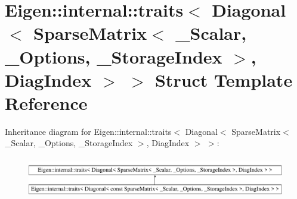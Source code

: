 \hypertarget{struct_eigen_1_1internal_1_1traits_3_01_diagonal_3_01_sparse_matrix_3_01___scalar_00_01___option6bd26e34064fdba33a44f3bb621d4cca}{}\section{Eigen\+::internal\+::traits$<$ Diagonal$<$ Sparse\+Matrix$<$ \+\_\+\+Scalar, \+\_\+\+Options, \+\_\+\+Storage\+Index $>$, Diag\+Index $>$ $>$ Struct Template Reference}
\label{struct_eigen_1_1internal_1_1traits_3_01_diagonal_3_01_sparse_matrix_3_01___scalar_00_01___option6bd26e34064fdba33a44f3bb621d4cca}
Inheritance diagram for Eigen\+::internal\+::traits$<$ Diagonal$<$ Sparse\+Matrix$<$ \+\_\+\+Scalar, \+\_\+\+Options, \+\_\+\+Storage\+Index $>$, Diag\+Index $>$ $>$\+:\begin{figure}[H]
\begin{center}
\leavevmode
\includegraphics[height=1.797753cm]{struct_eigen_1_1internal_1_1traits_3_01_diagonal_3_01_sparse_matrix_3_01___scalar_00_01___option6bd26e34064fdba33a44f3bb621d4cca}
\end{center}
\end{figure}
